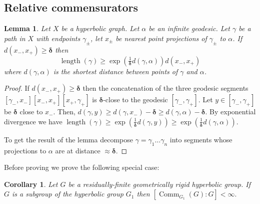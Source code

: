 \documentclass{amsart}
\numberwithin{equation}{section}
\newtheorem{lemma}[theorem]{Lemma}
\newtheorem{corollary}[theorem]{Corollary}
\theoremstyle{definition}
\newcommand{\bdelta}{{\boldsymbol\delta}}
\DeclareMathOperator{\Comm}{Comm}
\DeclareMathOperator{\length}{length}
\begin{document}
\subsection{Relative commensurators}

\begin{lemma}\label{exp divergence from geodesic}
    Let $X$ be a hyperbolic graph. Let $\alpha$ be an infinite geodesic. Let $\gamma$ be a path in $X$ with endpoints $\gamma_\pm$, let $x_\pm$ be nearest point projections of $\gamma_\pm$ to $\alpha$. If  $d(x_-,x_+)\ge \bdelta$ then $$\length(\gamma)\ge \exp(\tfrac 1 \bdelta d(\gamma,\alpha)) d(x_-,x_+)$$
    where $d(\gamma,\alpha)$ is the shortest distance between points of $\gamma$ and $\alpha$.
\end{lemma}
\begin{proof}
    If $d(x_-,x_+)\ge \bdelta$ then the concatenation of the three geodesic segments $[\gamma_-,x_-][x_-,x_+][x_+,\gamma_+]$ is $\bdelta$-close to the geodesic $[\gamma_-,\gamma_+]$.
    Let $y\in [\gamma_-,\gamma_+]$ be $\bdelta$ close to $x_-$. Then,
    $d(\gamma,y)\ge d(\gamma,x_-)-\bdelta\ge d(\gamma,\alpha)-\bdelta$. 
    By exponential divergence we have $\length(\gamma)\ge \exp(\tfrac 1\bdelta d(\gamma,y))\ge \exp(\tfrac 1\bdelta d(\gamma,\alpha))$. 
    
    To get the result of the lemma decompose $\gamma = \gamma_1\dots\gamma_n$ into segments whose projections to $\alpha$ are at distance $\approx \bdelta$.
\end{proof}

Before proving  we prove the following special case:

\begin{corollary}\label{commensurators of rigids}
Let $G$ be a residually-finite geometrically rigid hyperbolic group. If $G$ is a subgroup of the hyperbolic group $G_1$ then $[\Comm_{G_1}(G):G]<\infty.$
\end{corollary}
\end{document}
